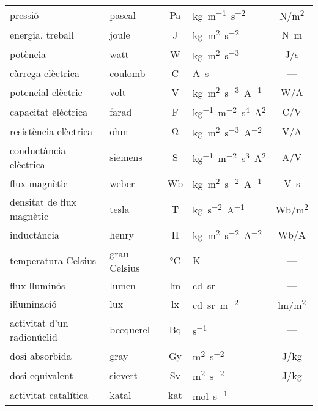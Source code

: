 \begin{ThreePartTable}
\begin{longtable}[h]{llclc}
   pressió & pascal & Pa  & \unit{kg.m^{-1}.s^{-2}} & \unit{N/m^2} \\
   energia, treball & joule & J & \unit{kg.m^2.s^{-2}} & \unit{N.m}\\
   potència & watt & W & \unit{kg.m^2.s^{-3}}  & \unit{J/s}\\
   càrrega elèctrica & coulomb & C  & \unit{A.s} &  ---\\
   potencial elèctric & volt & V & \unit{kg.m^2.s^{-3}.A^{-1}}  & \unit{W/A}\\
   capacitat elèctrica & farad & F   & \unit{kg^{-1}.m^{-2}.s^4.A^2}& \unit{C/V}\\
   resistència elèctrica & ohm &  \unit{\ohm}  & \unit{kg.m^2.s^{-3}.A^{-2}} & \unit{V/A}\\
   conductància elèctrica & siemens &  S  & \unit{kg^{-1}.m^{-2}.s^3.A^2} & \unit{A/V}\\
   flux magnètic & weber &  Wb  & \unit{kg.m^2.s^{-2}.A^{-1}} & \unit{V.s}\\
   densitat de flux magnètic & tesla &  T  & \unit{kg.s^{-2}.A^{-1}} & \unit{Wb/m^2}\\
   inductància & henry &  H  & \unit{kg.m^2.s^{-2}.A^{-2}} & \unit{Wb/A}\\
   temperatura Celsius & grau Celsius &  \unit{\degreeCelsius} & \unit{K} & --- \\
   flux lluminós & lumen & lm  & \unit{cd.sr}& ---\\
   iŀluminació & lux & lx & \unit{cd.sr.m^{-2}} & \unit{lm/m^2} \\
   activitat  d'un radionúclid & becquerel & Bq& \unit{s^{-1}} & --- \\
   dosi absorbida & gray & Gy  & \unit{m^2.s^{-2}}& \unit{J/kg}\\
   dosi equivalent & sievert & Sv  & \unit{m^2.s^{-2}}& \unit{J/kg}\\
   activitat catalítica & katal & kat & \unit{mol.s^{-1}} & ---\\
   \bottomrule[1pt]
\end{longtable}
\end{ThreePartTable}
       
   
    
   
   
   
